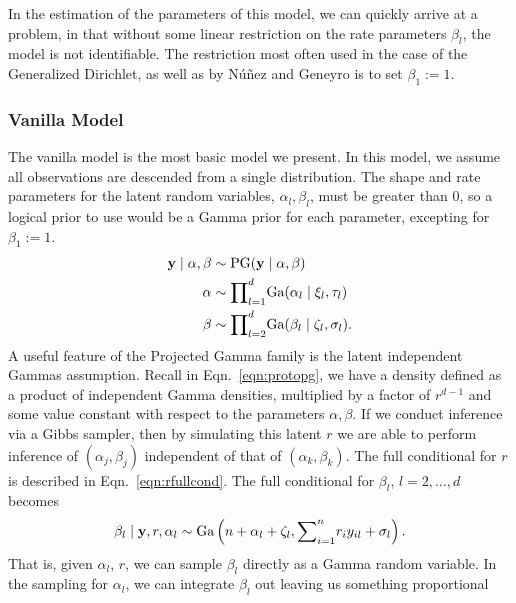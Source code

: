 In the estimation of the parameters of this model, we can quickly arrive at a problem, in that
  without some linear restriction on the rate parameters $\beta_l$, the model is not identifiable.
  The restriction most often used in the case of the Generalized Dirichlet, as well as by
  N{\'u}{\~n}ez and Geneyro\cite{nunez2019} is to set $\beta_1 := 1$.

\subsubsection{Vanilla Model}
The vanilla model is the most basic model we present.  In this model, we assume all observations
  are descended from a single distribution.  The shape and rate parameters for the latent
   random variables, $\alpha_l,\beta_l$, must be greater than 0, so a logical prior to
  use would be a Gamma prior for each parameter, excepting for $\beta_1 := 1$.
  \begin{equation}
    \label{eqn:vanillap}
    \begin{aligned}
      {\bf y}\mid\alpha,\beta &\sim \text{PG}({\bf y}\mid\alpha,\beta)\\
      {\bf \alpha} &\sim {\small \prod}_{l = 1}^d \text{Ga}(\alpha_l \mid \xi_l,\tau_l)\\
      {\bf \beta} &\sim {\small \prod}_{l = 2}^d \text{Ga}(\beta_l\mid \zeta_l,\sigma_l).
    \end{aligned}
  \end{equation}
  A useful feature of the Projected Gamma family is the latent independent Gammas assumption.  Recall
  in Eqn.~\ref{eqn:protopg}, we have a density defined as a product of independent Gamma densities,
  multiplied by a factor of $r^{d-1}$ and some value constant with respect to the parameters
  $\alpha,\beta$.  If we conduct inference via a Gibbs sampler, then by simulating this latent $r$
  we are able to perform inference of $(\alpha_j,\beta_j)$ independent of that of $(\alpha_k,\beta_k)$.
  The full conditional for $r$ is described in Eqn.~\ref{eqn:rfullcond}.  The full conditional for
  $\beta_l$, $l = 2,\ldots,d$ becomes
  \begin{equation}
    \label{eqn:betafc}
    \beta_l\mid {\bf y}, r, \alpha_l \sim \text{Ga}\left(n + \alpha_l + \zeta_l,
                                      {\small \sum}_{i = 1}^nr_iy_{il} + \sigma_l\right).
  \end{equation}
  That is, given $\alpha_l$, $r$, we can sample $\beta_l$ directly as a Gamma random variable.  In
  the sampling for $\alpha_l$, we can integrate $\beta_l$ out leaving us something proportional
